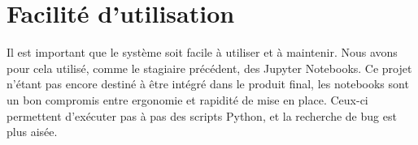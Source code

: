\section{Facilité d'utilisation\label{facilite_utilisation}}

Il est important que le système soit facile à utiliser et à maintenir.
Nous avons pour cela utilisé, comme le stagiaire précédent, des Jupyter Notebooks.
Ce projet n'étant pas encore destiné à être intégré dans le produit final,
les notebooks sont un bon compromis entre ergonomie et rapidité de mise en place.
Ceux-ci permettent d'exécuter pas à pas des scripts Python,
et la recherche de bug est plus aisée.

